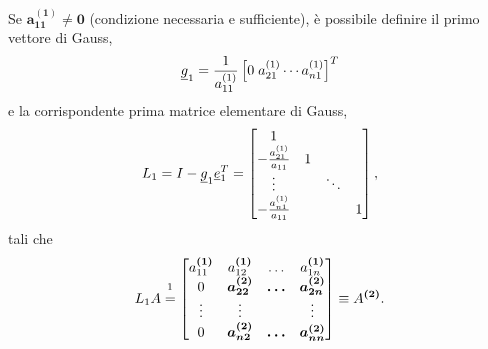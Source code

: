Se $\boldsymbol{a_{11}^{(1)}\neq 0}$ (condizione necessaria e sufficiente), è possibile definire il primo vettore di Gauss,\begin{equation}\label{eq:1oVettElemGauss}
    \uline g_1=\frac{1}{a_{11}^{(1)}}\left[0\; a_{21}^{(1)}\cdots a_{n1}^{(1)}\right]^T
\end{equation}
e la corrispondente prima matrice elementare di Gauss, 
\begin{equation}
    L_1=I-\uline g_1\uline e_1^T=\begin{bmatrix}
        1\\
        -\frac{a_{21}^{(1)}}{a_{11}} & 1\\
        \vdots & &\ddots\\
        -\frac{a_{n1}^{(1)}}{a_{11}} & & &1
    \end{bmatrix},
\end{equation}
tali che
\begin{equation*}
    L_1 A\overset{\footnotemark}{=}
    \begin{bmatrix}
        a_{11}^{\boldsymbol{(1)}} & a_{12}^{\boldsymbol{(1)}} & \hdots & a_{1n}^{\boldsymbol{(1)}}\\
        0 & \boldsymbol{a_{22}^{(2)}} & \boldsymbol\hdots & \boldsymbol{a_{2n}^{(2)}}\\
        \vdots & \boldsymbol\vdots & & \boldsymbol\vdots\\
        0 & \boldsymbol{a_{n2}^{(2)}} & \boldsymbol\hdots & \boldsymbol{a_{nn}^{(2)}}
    \end{bmatrix}\equiv A^{\boldsymbol{(2)}}.
\end{equation*}


